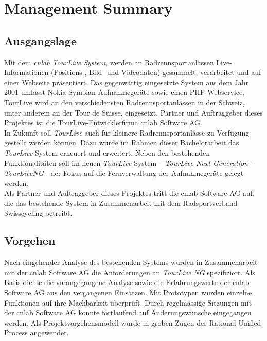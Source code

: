 \chapter*{Management Summary}
\section*{Ausgangslage}

Mit dem \textit{cnlab TourLive System}, werden an Radrennsportanlässen Live- Informationen (Positions-, Bild- und Videodaten) gesammelt, verarbeitet und auf einer Webseite präsentiert. Das gegenwärtig eingesetzte System aus dem Jahr 2001  umfasst Nokia Symbian Aufnahmegeräte sowie einen PHP Webservice. TourLive wird an den verschiedensten Radrennsportanlässen in der Schweiz, unter anderem an der Tour de Suisse, eingesetzt. Partner und Auftraggeber dieses Projektes ist die TourLive-Entwicklerfirma cnlab Software AG. 
\\

In Zukunft soll \textit{TourLive} auch für kleinere Radrennsportanlässe zu Verfügung gestellt werden können. Dazu wurde im Rahmen dieser Bachelorarbeit das \textit{TourLive} System erneuert und erweitert. Neben den bestehenden Funktionalitäten soll im neuen  \textit{TourLive} System – \textit{TourLive Next Generation} - \textit{TourLiveNG} - der Fokus auf die Fernverwaltung der Aufnahmegeräte gelegt werden. 
\\

Als Partner und Auftraggeber dieses Projektes tritt die cnlab Software AG auf, die das bestehende System in Zusammenarbeit mit dem Radsportverband Swisscycling betreibt.

\section*{Vorgehen}
Nach eingehender Analyse des bestehenden Systems wurden in Zusammenarbeit mit der cnlab Software AG die Anforderungen an \textit{TourLive NG} spezifiziert. Als Basis diente die vorangegangene Analyse sowie die  Erfahrungswerte der cnlab Software AG aus den vergangenen Einsätzen. Mit Prototypen wurden einzelne Funktionen auf ihre Machbarkeit überprüft. Durch regelmässige Sitzungen mit der cnlab Software AG konnte fortlaufend auf Änderungswünsche eingegangen werden. Als Projektvorgehensmodell wurde in groben Zügen der Rational Unified Process angewendet.
\newpage 

